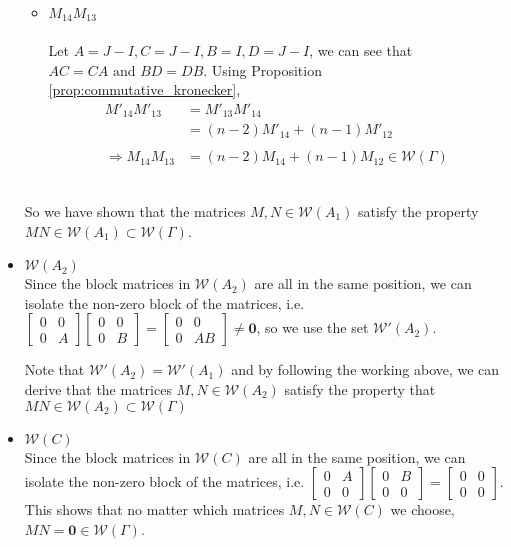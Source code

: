 \documentclass{article}
\begin{document}
\begin{itemize}
\begin{itemize}
        \item $M_{14}M_{13}$ \\ \\
        Let $A = J-I, C = J-I, B = I, D=J-I$, we can see that $AC=CA \text{ and } BD=DB$. Using Proposition \ref{prop:commutative_kronecker}, 
        \begin{align*}
            M'_{14}M'_{13} 
            &= M'_{13}M'_{14} \\
            &= (n-2)M'_{14} + (n-1)M'_{12} \\ \\
            \Rightarrow M_{14}M_{13} &= (n-2)M_{14} + (n-1)M_{12} \in \mathcal{W}(\Gamma)
        \end{align*} \\
    \end{itemize}
    So we have shown that the matrices $M,N \in \mathcal{W}(A_1)$ satisfy the property $MN \in \mathcal{W}(A_1) \subset \mathcal{W}(\Gamma)$.

    \item $\mathcal{W}(A_2)$ \\
    Since the block matrices in $\mathcal{W}(A_2)$ are all in the same position, we can isolate the non-zero block of the matrices, i.e. $\begin{bmatrix}
        0 & 0 \\ 0 & A
    \end{bmatrix}\begin{bmatrix}
        0&0\\0&B
    \end{bmatrix} = \begin{bmatrix}
        0&0\\0&AB
    \end{bmatrix}\neq \mathbf{0}$, so we use the set $\mathcal{W'}(A_2)$.

    Note that $\mathcal{W'}(A_2) = \mathcal{W'}(A_1)$ and by following the working above, we can derive that the matrices  $M,N \in \mathcal{W}(A_2)$ satisfy the property that $MN \in \mathcal{W}(A_2) \subset \mathcal{W}(\Gamma)$

    \item $\mathcal{W}(C)$ \\
    Since the block matrices in $\mathcal{W}(C)$ are all in the same position, we can isolate the non-zero block of the matrices, i.e. $\begin{bmatrix}
        0 & A \\ 0 & 0
    \end{bmatrix}\begin{bmatrix}
        0&B\\0&0
    \end{bmatrix} = \begin{bmatrix}
        0&0\\0&0
    \end{bmatrix}$. This shows that no matter which matrices $M,N \in \mathcal{W}(C)$ we choose, $MN=\mathbf{0} \in \mathcal{W}(\Gamma)$.


\end{itemize}
\end{document}
